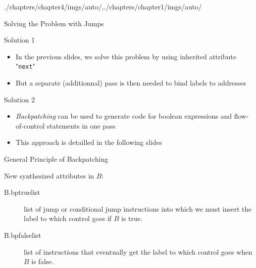 \begin{graphicspathcontext}{{./chapters/chapter4/imgs/auto/},{./chapters/chapter1/imgs/auto/}}
\begin{bibunit}[apalike]
\begin{frame}{Solving the Problem with Jumps}
	\begin{block}{Solution 1}
		\begin{itemize}
			\item In the previous slides, we solve this problem by using inherited attribute "\texttt{next}"
			\item \alert{But a separate (additionnal) pass is then needed to bind labels to addresses}
		\end{itemize}
	\end{block}
	\vspace{1cm}
	\begin{block}{Solution 2}
		\begin{itemize}
			\item \emph{Backpatching} can be used to generate code for boolean expressions and flow-of-control statements in one pass
			\item This approach is detailled in the following slides
		\end{itemize}
	\end{block}
\end{frame}

\begin{frame}{General Principle of Backpatching}
	\begin{rightarrowsequence}
	\end{rightarrowsequence}
	\vspace{.5cm}
	New synthesized attributes in $B$:
	\begin{description}
		\item[B.bptruelist] list of jump or conditional jump instructions into which we must insert the label to which control goes if $B$ is true.
		\vfill
		\item[B.bpfalselist] list of instructions that eventually get the label to which control goes when $B$ is false.
	\end{description}
\end{frame}


\end{bibunit}
\end{graphicspathcontext}
